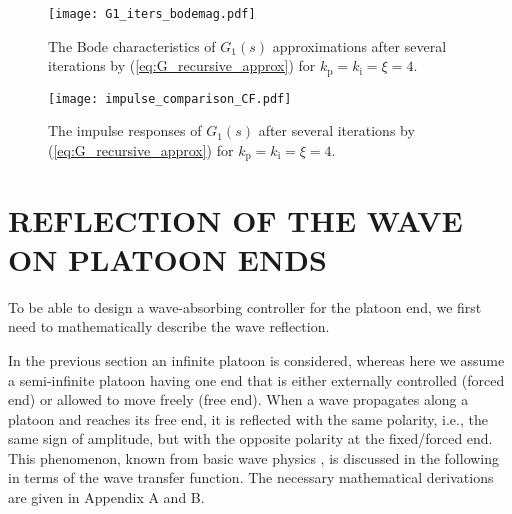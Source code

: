 \documentclass[final,5p,times,twocolumn]{elsarticle}
\begin{document}
\begin{figure}[htb]\centering
  \texttt{[image: G1\_iters\_bodemag.pdf]}
  \caption{The Bode characteristics of $G_{1}(s)$ approximations after several iterations by (\ref{eq:G_recursive_approx}) for $k_{\text{p}}=k_{\text{i}}=\xi=4$.}
  \label{fig:bode_comparison_only_exact}
\end{figure}
\begin{figure}[htb]\centering
\texttt{[image: impulse\_comparison\_CF.pdf]}
  \caption{The impulse responses of $G_{1}(s)$ after several iterations by (\ref{eq:G_recursive_approx}) for $k_{\text{p}}=k_{\text{i}}=\xi=4$.}
  \label{fig:impulse_comparison_only_exact}
\end{figure}


\section{REFLECTION OF THE WAVE ON PLATOON ENDS}
\label{sec:reflections}

To be able to design a wave-absorbing controller for the platoon end, we first need to mathematically describe the wave reflection.

In the previous section an infinite platoon is considered, whereas here we assume a semi-infinite platoon having one end that is either externally controlled (forced end) or allowed to move freely (free end). When a wave propagates along a platoon and reaches its free end, it is reflected with the same polarity, i.e., the same sign of amplitude, but with the opposite polarity at the fixed/forced end. This phenomenon, known from basic wave physics \cite{french2003}, is discussed in the following in terms of the wave transfer function. The necessary mathematical derivations are given in Appendix A and B.
\end{document}
